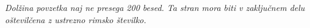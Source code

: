 \textit{Dolžina povzetka naj ne presega 200 besed. Ta stran mora biti v zaključnem delu oštevilčena z ustrezno rimsko številko.}